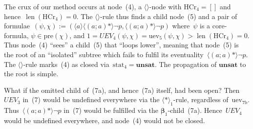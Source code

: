 \documentclass{entcs}
\newcommand{\pnot}[1]{\lnot #1}
\newcommand{\pea}[2]{\langle#1\rangle #2}
\newcommand{\psp}[2]{#1;#2}
\newcommand{\prp}[1]{#1*}
\newcommand{\ppre}[1]{\mathrm{pre}(#1)}
\newcommand{\thc}{\mathrm{HCr}}
\newcommand{\tmrk}{\mathrm{stat}}
\newcommand{\tuev}{\mathrm{uev}}
\newcommand{\tbeta}{\boldsymbol{\beta}}
\newcommand{\trero}{$\pea{\prp{}}{}_1$}
\newcommand{\trea}{$\langle\rangle$}
\newcommand{\ttrue}{\mathbf{unsat}}
\newcommand{\llen}{\mathop{\mathrm{len}}}
\newcommand{\exaasp}{\pea{\prp{(\psp{a}{a})}}{\pnot{p}}}
\begin{document}
The crux of our method occurs at node~(4),
a \trea{}-node with $\thc_4 = []$ and hence~$\llen(\thc_4) = 0$.
The \trea{}-rule thus finds a child node~(5)
and a pair of formulae~$(\psi, \chi) := (\pea{a}{\exaasp}, \exaasp)$
where~$\psi$ is a core-formula, $\psi \in \ppre{\chi}$,
and $1 = UEV_4(\psi, \chi) = \tuev_5(\psi, \chi) > \llen(\thc_4) = 0$.
Thus node~(4) ``sees'' a child~(5) that ``loops lower'',
meaning that node~(5) is the root of an ``isolated'' subtree
which fails to fulfil its eventuality~$\exaasp$.
The \trea{}-rule marks~(4) as closed via~$\tmrk_4 = \ttrue$.
The propagation of $\ttrue$ to the root is simple.

What if the omitted child of~(7a), and hence~(7a) itself, had been open?
Then~$UEV_3$ in~(7) would be undefined everywhere via the
\trero{}-rule, regardless of~$\tuev_{7\mathrm{b}}$.
Thus~$\exaasp$ in~(7) would be fulfilled via the $\tbeta_1$-child~(7a).
Hence~$UEV_4$ would be undefined everywhere,
and node~(4) would not be closed.
\end{document}
